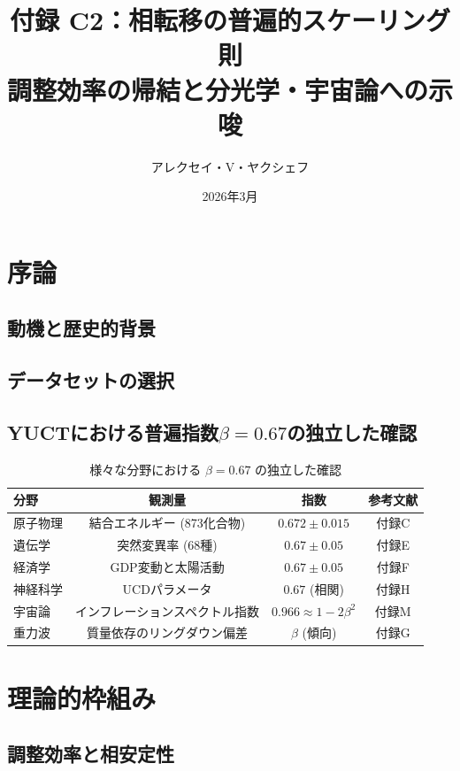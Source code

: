 \documentclass[11pt,a4paper]{article}
\title{付録 C2：相転移の普遍的スケーリング則\\
	\large 調整効率の帰結と分光学・宇宙論への示唆}
\author{アレクセイ・V・ヤクシェフ}
\date{2026年3月}
\begin{document}
	
	\maketitle
	\tableofcontents
	
	\section{序論}
	\subsection{動機と歴史的背景}
	\subsection{データセットの選択}
	\subsection{YUCTにおける普遍指数\(\beta = 0.67\)の独立した確認}
	
	\begin{table}[htbp]
		\centering
		\caption{様々な分野における \(\beta = 0.67\) の独立した確認}
		\label{tab:beta_confirmation}
		\begin{tabular}{@{}lccc@{}}
			\toprule
			\textbf{分野} & \textbf{観測量} & \textbf{指数} & \textbf{参考文献} \\
			\midrule
			原子物理 & 結合エネルギー (873化合物) & \(0.672\pm0.015\) & 付録C \\
			遺伝学 & 突然変異率 (68種) & \(0.67\pm0.05\) & 付録E \\
			経済学 & GDP変動と太陽活動 & \(0.67\pm0.05\) & 付録F \\
			神経科学 & UCDパラメータ & \(0.67\) (相関) & 付録H \\
			宇宙論 & インフレーションスペクトル指数 & \(0.966 \approx 1-2\beta^2\) & 付録M \\
			重力波 & 質量依存のリングダウン偏差 & \(\beta\) (傾向) & 付録G \\
			\bottomrule
		\end{tabular}
	\end{table}
	
	\section{理論的枠組み}
	\subsection{調整効率と相安定性}
\end{document}
